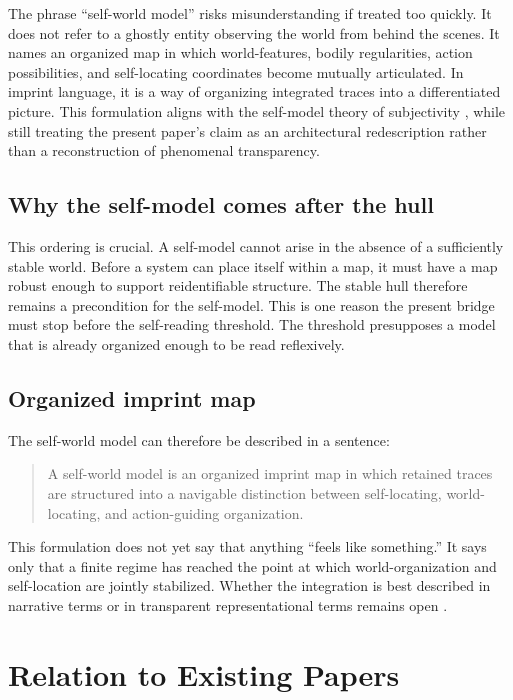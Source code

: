 \documentclass[12pt]{article}
\begin{document}
The phrase ``self-world model'' risks misunderstanding if treated too quickly. It does not refer to a ghostly entity observing the world from behind the scenes. It names an organized map in which world-features, bodily regularities, action possibilities, and self-locating coordinates become mutually articulated. In imprint language, it is a way of organizing integrated traces into a differentiated picture. This formulation aligns with the self-model theory of subjectivity \cite{Metzinger2003}, while still treating the present paper's claim as an architectural redescription rather than a reconstruction of phenomenal transparency.

\subsection{Why the self-model comes after the hull}

This ordering is crucial. A self-model cannot arise in the absence of a sufficiently stable world. Before a system can place itself within a map, it must have a map robust enough to support reidentifiable structure. The stable hull therefore remains a precondition for the self-model. This is one reason the present bridge must stop before the self-reading threshold. The threshold presupposes a model that is already organized enough to be read reflexively.

\subsection{Organized imprint map}

The self-world model can therefore be described in a sentence:

\begin{quote}
A self-world model is an organized imprint map in which retained traces are structured into a navigable distinction between self-locating, world-locating, and action-guiding organization.
\end{quote}

This formulation does not yet say that anything ``feels like something.'' It says only that a finite regime has reached the point at which world-organization and self-location are jointly stabilized. Whether the integration is best described in narrative terms or in transparent representational terms remains open \cite{Dennett1992,Metzinger2003}.

\section{Relation to Existing Papers}
\end{document}
